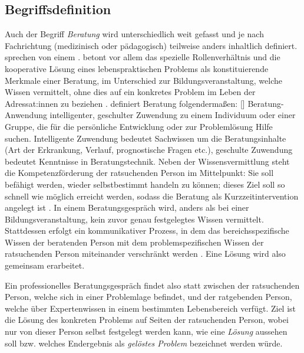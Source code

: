 \documentclass[
  twoside,
  parskip=half-,
  paper=176mm:246mm,
  BCOR=14mm,
  DIV=14,
]{scrreprt}
\makeatletter
\renewenvironment*{displayquote}
  {\begingroup\setlength{\leftmargini}{0pt}\csq@getcargs{\csq@bdquote{}{}}}
  {\csq@edquote\endgroup}
\makeatother
\begin{document}
\subsection{Begriffsdefinition}
Auch der Begriff \textit{Beratung} wird unterschiedlich weit gefasst und je nach Fachrichtung (medizinisch oder pädagogisch) teilweise anders inhaltlich definiert. \citeauthor{hacker2021} sprechen von einem . \citeauthor{dinkelaker} betont vor allem das spezielle Rollenverhältnis und die kooperative Lösung eines lebenspraktischen Problems als konstituierende Merkmale einer Beratung, im Unterschied zur Bildungsveranstaltung, welche Wissen vermittelt, ohne dies auf ein konkretes Problem im Leben der Adressat:innen zu beziehen \autocite[178f.]{dinkelaker}. \citeauthor{integrativePsycho} definiert Beratung folgendermaßen:
\begin{displayquote}[{\cite[898]{integrativePsycho}}]
  Beratung- Anwendung intelligenter, geschulter Zuwendung zu einem Individuum oder einer Gruppe, die für die persönliche Entwicklung oder zur Problemlösung Hilfe suchen. Intelligente Zuwendung bedeutet Sachwissen um die Beratungsinhalte (Art der Erkrankung, Verlauf, prognostische Fragen etc.), geschulte Zuwendung bedeutet Kenntnisse in Beratungstechnik.
\end{displayquote}
Neben der Wissensvermittlung steht die Kompetenzförderung der ratsuchenden Person im Mittelpunkt: Sie soll befähigt werden, wieder selbstbestimmt handeln zu können; dieses Ziel soll so schnell wie möglich erreicht werden, sodass die Beratung als Kurzzeitintervention angelegt ist \autocite[vgl.][]{BZGABeratungEdukation}. In einem Beratungsgespräch wird, anders als bei einer Bildungsveranstaltung, kein zuvor genau festgelegtes Wissen vermittelt. Stattdessen erfolgt ein kommunikativer Prozess, in dem das bereichsspezifische Wissen der beratenden Person mit dem problemspezifischen Wissen der ratsuchenden Person miteinander verschränkt werden \autocite[vgl.][178]{dinkelaker}. Eine Lösung wird also gemeinsam erarbeitet. 

Ein professionelles Beratungsgespräch findet also statt zwischen der ratsuchenden Person, welche sich in einer Problemlage befindet, und der ratgebenden Person, welche über Expertenwissen in einem bestimmten Lebensbereich verfügt. Ziel ist die Lösung des konkreten Problems auf Seiten der ratsuchenden Person, wobei nur von dieser Person selbst festgelegt werden kann, wie eine \textit{Lösung} aussehen soll bzw. welches Endergebnis als \textit{gelöstes Problem} bezeichnet werden würde. 
\end{document}

